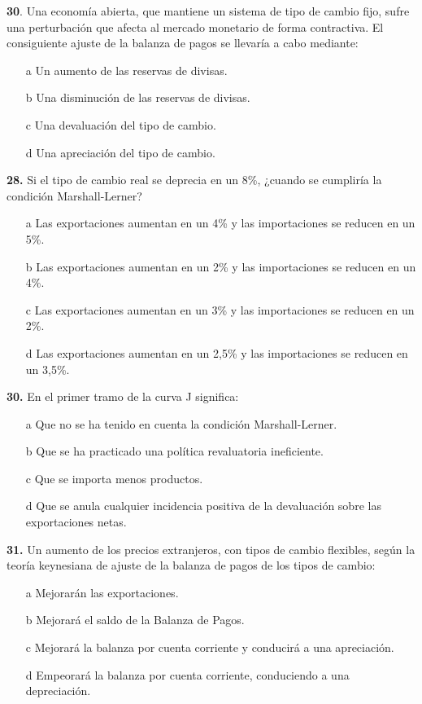\documentclass{nuevotema}
\begin{document}

\textbf{30}. Una economía abierta, que mantiene un sistema de tipo de cambio fijo, sufre una perturbación que afecta al mercado monetario de forma contractiva. El consiguiente ajuste de la balanza de pagos se llevaría a cabo mediante:
\begin{enumerate}
	\item[a] Un aumento de las reservas de divisas.
	\item[b] Una disminución de las reservas de divisas.
	\item[c] Una devaluación del tipo de cambio.
	\item[d] Una apreciación del tipo de cambio.
\end{enumerate}

\textbf{28.} Si el tipo de cambio real se deprecia en un 8\%, ¿cuando se cumpliría la condición Marshall-Lerner?

\begin{itemize}
	\item[a] Las exportaciones aumentan en un 4\% y las importaciones se reducen en un 5\%.
	\item[b] Las exportaciones aumentan en un 2\% y las importaciones se reducen en un 4\%.
	\item[c] Las exportaciones aumentan en un 3\% y las importaciones se reducen en un 2\%.
	\item[d] Las exportaciones aumentan en un 2,5\% y las importaciones se reducen en un 3,5\%.
\end{itemize}

\textbf{30.} En el primer tramo de la curva J significa:

\begin{itemize}
	\item[a] Que no se ha tenido en cuenta la condición Marshall-Lerner.
	\item[b] Que se ha practicado una política revaluatoria ineficiente.
	\item[c] Que se importa menos productos.
	\item[d] Que se anula cualquier incidencia positiva de la devaluación sobre las exportaciones netas.
\end{itemize}

\textbf{31.} Un aumento de los precios extranjeros, con tipos de cambio flexibles, según la teoría keynesiana de ajuste de la balanza de pagos de los tipos de cambio:
\begin{enumerate}
	\item[a] Mejorarán las exportaciones.
	\item[b] Mejorará el saldo de la Balanza de Pagos.
	\item[c] Mejorará la balanza por cuenta corriente y conducirá a una apreciación.
	\item[d] Empeorará la balanza por cuenta corriente, conduciendo a una depreciación.
\end{enumerate}
\end{document}
